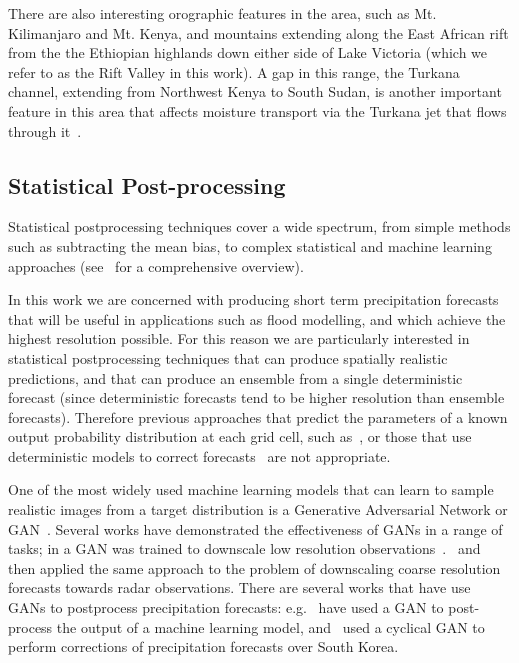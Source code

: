 \documentclass{article}
\begin{document}
There are also interesting orographic features in the area, such as Mt. Kilimanjaro and Mt. Kenya, and mountains extending along the East African rift from the the Ethiopian highlands down either side of Lake Victoria (which we refer to as the Rift Valley in this work). A gap in this range, the Turkana channel, extending from Northwest Kenya to South Sudan, is another important feature in this area that affects moisture transport via the Turkana jet that flows through it~\citep{nicholson_turkana_2016}.



\subsection{Statistical Post-processing}

Statistical postprocessing techniques cover a wide spectrum, from simple methods such as subtracting the mean bias, to complex statistical and machine learning approaches (see~\cite{vannitsem_statistical_2021} for a comprehensive overview). 


In this work we are concerned with producing short term precipitation forecasts that will be useful in applications such as flood modelling, and which achieve the highest resolution possible. For this reason we are particularly interested in statistical postprocessing techniques that can produce spatially realistic predictions, and that can produce an ensemble from a single deterministic forecast (since deterministic forecasts tend to be higher resolution than ensemble forecasts). Therefore previous approaches that predict the parameters of a known output probability distribution at each grid cell, such as~\citep{rasp_neural_2018}, or those that use deterministic models to correct forecasts~\citep{gronquist_deep_2021, han_deep_2021, horat_deep_2023} are not appropriate.

One of the most widely used machine learning models that can learn to sample realistic images from a target distribution is a Generative Adversarial Network or GAN~\citep{goodfellow_generative_2014}. Several works have demonstrated the effectiveness of GANs in a range of tasks; in \cite{leinonen_stochastic_2020} a GAN was trained to downscale low resolution observations~\citep{leinonen_stochastic_2020}.~\cite{harris_generative_2022} and~\cite{price_increasing_2022} then applied the same approach to the problem of downscaling coarse resolution forecasts towards radar observations. There are several works that have use GANs to postprocess precipitation forecasts: e.g.~\cite{duncan_generative_2022} have used a GAN to post-process the output of a machine learning model, and~\cite{jeong_correcting_2023} used a cyclical GAN to perform corrections of precipitation forecasts over South Korea.
\end{document}
